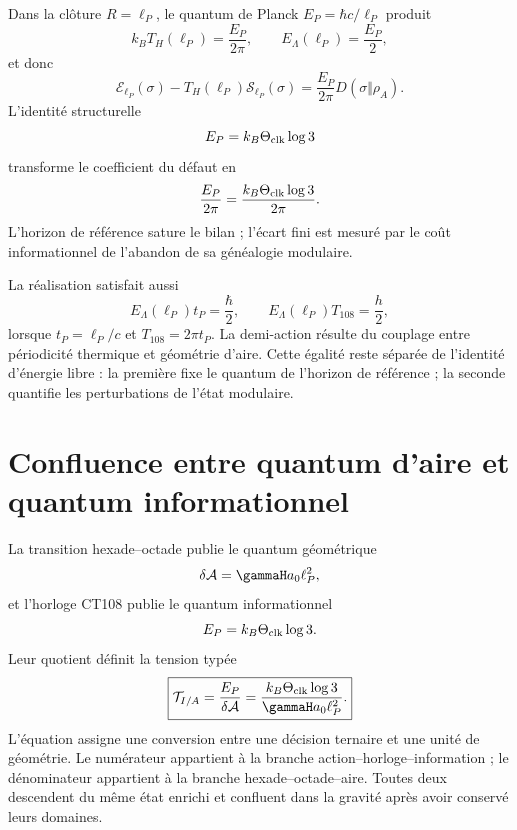 Dans la clôture \(R=\ell_P\), le quantum de Planck
\(E_P=\hbar c/\ell_P\) produit
\begin{equation}
 k_BT_H(\ell_P)=\frac{E_P}{2\pi},
 \qquad
 E_\Lambda(\ell_P)=\frac{E_P}{2},
 \label{eq:rm-info-planck-horizon-data}
\end{equation}
et donc
\begin{equation}
 \boxed{
 \mathcal E_{\ell_P}(\sigma)
 -T_H(\ell_P)\mathcal S_{\ell_P}(\sigma)
 =\frac{E_P}{2\pi}D(\sigma\Vert\rho_A).}
 \label{eq:rm-info-planck-free-energy}
\end{equation}
L'identité structurelle
\begin{equation}
 E_P=k_B\Theta_{\rm clk}\log3
 \label{eq:rm-info-planck-trit}
\end{equation}
transforme le coefficient du défaut en
\begin{equation}
 \frac{E_P}{2\pi}
 =\frac{k_B\Theta_{\rm clk}\log3}{2\pi}.
 \label{eq:rm-info-trit-free-energy}
\end{equation}
L'horizon de référence sature le bilan ; l'écart fini est
mesuré par le coût informationnel de l'abandon de sa généalogie modulaire.

La réalisation satisfait aussi
\begin{equation}
 E_\Lambda(\ell_P)t_P=\frac{\hbar}{2},
 \qquad
 E_\Lambda(\ell_P)T_{108}=\frac h2,
 \label{eq:rm-info-half-action}
\end{equation}
lorsque \(t_P=\ell_P/c\) et \(T_{108}=2\pi t_P\). La demi-action
résulte du couplage entre périodicité thermique et géométrie d'aire.
Cette égalité reste séparée de l'identité d'énergie libre : la
première fixe le quantum de l'horizon de référence ; la seconde quantifie
les perturbations de l'état modulaire.

\section{Confluence entre quantum d'aire et quantum informationnel}

La transition hexade--octade publie le quantum géométrique
\begin{equation}
 \delta\mathcal A
 =\gammaH a_0\ell_P^2,
 \label{eq:rm-info-area-quantum}
\end{equation}
et l'horloge CT108 publie le quantum informationnel
\begin{equation}
 E_P=k_B\Theta_{\rm clk}\log3.
 \label{eq:rm-info-energy-quantum}
\end{equation}
Leur quotient définit la tension typée
\begin{equation}
 \boxed{
 \mathcal T_{I/A}
 =\frac{E_P}{\delta\mathcal A}
 =\frac{k_B\Theta_{\rm clk}\log3}
 {\gammaH a_0\ell_P^2}.}
 \label{eq:rm-info-tension-information-area}
\end{equation}
L'équation assigne une conversion entre une décision ternaire et une
unité de géométrie. Le numérateur appartient à la branche
action--horloge--information ; le dénominateur appartient à la branche
hexade--octade--aire. Toutes deux descendent du même état enrichi et
confluent dans la gravité après avoir conservé leurs domaines.

